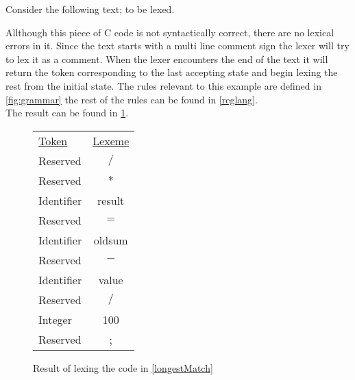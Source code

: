 \begin{example} \label{longestMatch}
Consider the following text; to be lexed.

Allthough this piece of C code is not syntactically correct, there are no
lexical errors in it. Since
the text starts with a multi line comment sign the lexer will try to lex it as
a comment. When the lexer encounters the end of the text it will return the
token corresponding to the last accepting state and begin lexing the rest from
the initial state. The rules relevant to this example are defined in 
\cref{fig:grammar} the rest of the rules can be found in \cref{reglang}.\\
The result can be found in \cref{fig:longestmatch}.
\end{example}

\begin{figure}[h!]
\begin{center}
\begin{tabular}{l c}
\underline{Token} & \underline{Lexeme}\\
Reserved & $/$\\
Reserved & $*$\\
Identifier & result\\
Reserved & $=$\\
Identifier & oldsum\\
Reserved & $-$\\
Identifier & value\\
Reserved & $/$\\
Integer & 100\\
Reserved & ;
\end{tabular}
\end{center}
\caption{Result of lexing the code in \cref{longestMatch} \label{fig:longestmatch}}
\end{figure}


